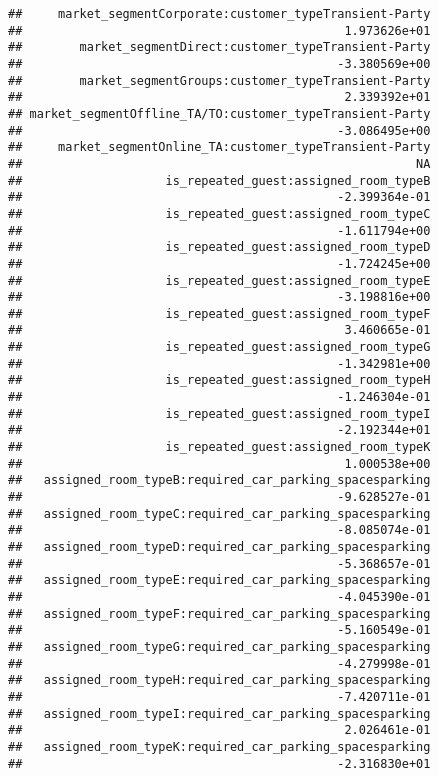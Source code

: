 \documentclass[
]{article}
\begin{document}
\begin{verbatim}
##     market_segmentCorporate:customer_typeTransient-Party 
##                                             1.973626e+01 
##        market_segmentDirect:customer_typeTransient-Party 
##                                            -3.380569e+00 
##        market_segmentGroups:customer_typeTransient-Party 
##                                             2.339392e+01 
## market_segmentOffline_TA/TO:customer_typeTransient-Party 
##                                            -3.086495e+00 
##     market_segmentOnline_TA:customer_typeTransient-Party 
##                                                       NA 
##                    is_repeated_guest:assigned_room_typeB 
##                                            -2.399364e-01 
##                    is_repeated_guest:assigned_room_typeC 
##                                            -1.611794e+00 
##                    is_repeated_guest:assigned_room_typeD 
##                                            -1.724245e+00 
##                    is_repeated_guest:assigned_room_typeE 
##                                            -3.198816e+00 
##                    is_repeated_guest:assigned_room_typeF 
##                                             3.460665e-01 
##                    is_repeated_guest:assigned_room_typeG 
##                                            -1.342981e+00 
##                    is_repeated_guest:assigned_room_typeH 
##                                            -1.246304e-01 
##                    is_repeated_guest:assigned_room_typeI 
##                                            -2.192344e+01 
##                    is_repeated_guest:assigned_room_typeK 
##                                             1.000538e+00 
##   assigned_room_typeB:required_car_parking_spacesparking 
##                                            -9.628527e-01 
##   assigned_room_typeC:required_car_parking_spacesparking 
##                                            -8.085074e-01 
##   assigned_room_typeD:required_car_parking_spacesparking 
##                                            -5.368657e-01 
##   assigned_room_typeE:required_car_parking_spacesparking 
##                                            -4.045390e-01 
##   assigned_room_typeF:required_car_parking_spacesparking 
##                                            -5.160549e-01 
##   assigned_room_typeG:required_car_parking_spacesparking 
##                                            -4.279998e-01 
##   assigned_room_typeH:required_car_parking_spacesparking 
##                                            -7.420711e-01 
##   assigned_room_typeI:required_car_parking_spacesparking 
##                                             2.026461e-01 
##   assigned_room_typeK:required_car_parking_spacesparking 
##                                            -2.316830e+01
\end{verbatim}
\end{document}
